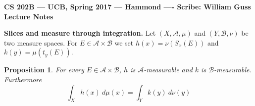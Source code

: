 \documentclass[11pt]{amsart}
\newtheorem{proposition}[theorem]{Proposition}
\theoremstyle{definition}
\def\scriptb{{\mathcal B}}
\def\scripta{{\mathcal A}}
\begin{document}
\begin{center}{\bf CS 202B --- UCB, Spring 2017 --- Hammond ---- Scribe: William Guss}
\\
{\bf Lecture Notes}
\end{center}

\textbf{Slices and measure through integration.}
Let  $(X, \scripta, \mu)$ and $(Y, \scriptb, \nu)$ be two measure spaces. For $E \in \scripta \times \scriptb$ we set $h(x) = \nu(S_x(E))$ and $k(y) = \mu(t_y(E)).$

\begin{proposition}
	For every $E \in \scripta \times \scriptb$, $h$ is $\scripta$-measurable and $k$ is $\scriptb$-measurable. Furthermore
	\begin{equation*}
		\int_X h(x)\ d\mu(x) = \int_Y k(y)\ d\nu(y)
 	\end{equation*}
\end{proposition}
\end{document}

